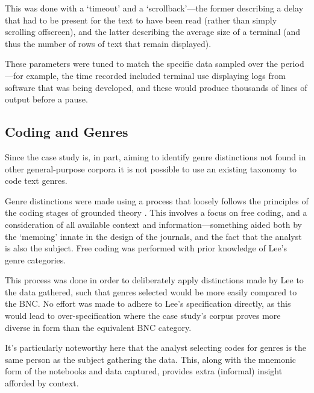 This was done with a `timeout' and a `scrollback'---the former describing a delay that had to be present for the text to have been read (rather than simply scrolling offscreen), and the latter describing the average size of a terminal (and thus the number of rows of text that remain displayed).

These parameters were tuned to match the specific data sampled over the period---for example, the time recorded included terminal use displaying logs from software that was being developed, and these would produce thousands of lines of output before a pause.




\subsection{Coding and Genres}
Since the case study is, in part, aiming to identify genre distinctions not found in other general-purpose corpora it is not possible to use an existing taxonomy to code text genres.



Genre distinctions were made using a process that loosely follows the principles of the coding stages of grounded theory .  
This involves a focus on free coding, and a consideration of all available context and information---something aided both by the `memoing' innate in the design of the journals, and the fact that the analyst is also the subject.  Free coding was performed with prior knowledge of Lee's genre categories.


This process was done in order to deliberately apply distinctions made by Lee to the data gathered, such that genres selected would be more easily compared to the BNC.  No effort was made to adhere to Lee's specification directly, as this would lead to over-specification where the case study's corpus proves more diverse in form than the equivalent BNC category.

It's particularly noteworthy here that the analyst selecting codes for genres is the same person as the subject gathering the data.  This, along with the mnemonic form of the notebooks and data captured, provides extra (informal) insight afforded by context.









